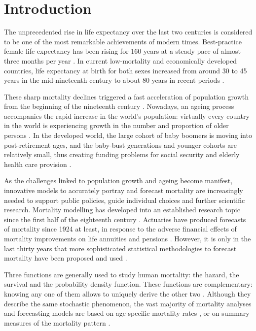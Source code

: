\documentclass[Thesis]{subfiles}
\begin{document}
\newpage


\normalsize

\section{Introduction}\label{Sec:Ch3sec1}

The unprecedented rise in life expectancy over the last two centuries is considered to be one of the most remarkable achievements of modern times. Best-practice female life expectancy has been rising for 160 years at a steady pace of almost three months per year \citep{oeppen2002broken}. In current low-mortality and economically developed countries, life expectancy at birth for both sexes increased from around 30 to 45 years in the mid-nineteenth century to about 80 years in recent periods \citep{mesle2011historical}.

These sharp mortality declines triggered a fast acceleration of population growth from the beginning of the nineteenth century \citep{maddison2006contours}. Nowadays, an ageing process accompanies the rapid increase in the world's population: virtually every country in the world is experiencing growth in the number and proportion of older persons \citep{United2015world}. In the developed world, the large cohort of baby boomers is moving into post-retirement ages, and the baby-bust generations and younger cohorts are relatively small, thus creating funding problems for social security and elderly health care provision \citep{booth2006demographic}. 

As the challenges linked to population growth and ageing become manifest, innovative models to accurately portray and forecast mortality are increasingly needed to support public policies, guide individual choices and further scientific research. Mortality modelling has developed into an established research topic since the first half of the eighteenth century \citep{tabeau2001review}. Actuaries have produced forecasts of mortality since 1924 at least, in response to the adverse financial effects of mortality improvements on life annuities and pensions \citep{pollard1987projection}. However, it is only in the last thirty years that more sophisticated statistical methodologies to forecast mortality have been proposed and used \citep{booth2008mortality}. 

Three functions are generally used to study human mortality: the hazard, the survival and the probability density function. These functions are complementary: knowing any one of them allows to uniquely derive the other two \citep{klein2003survival}. Although they describe the same stochastic phenomenon, the vast majority of mortality analyses and forecasting models are based on age-specific mortality rates \citep[the discrete-time equivalent of the hazard, for example][]{lee1992modeling,currie2004smoothing,li2005coherent,cairns2006two,hyndman2007robust}, or on summary measures of the mortality pattern \citep[such as life expectancy at birth, as in][]{torri2012forecasting,raftery2013bayesian}. 
\end{document}

